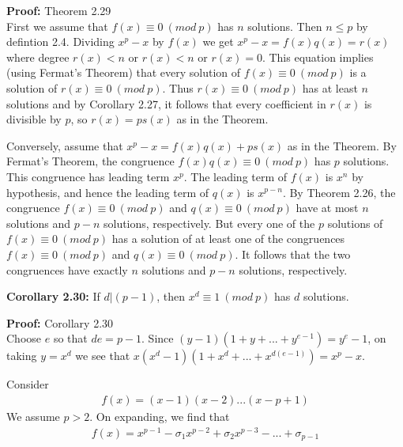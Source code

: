 \documentclass[a4paper]{article}
\begin{document}
\textbf{Proof:} Theorem 2.29\\
First we assume that $f(x)\equiv 0\ (mod\ p)$ has $n$ solutions. Then $n\leq p$ by defintion 2.4. Dividing $x^p-x$ by $f(x)$ we get $x^p-x=f(x)q(x)=r(x)$ where degree $r(x)<n$ or $r(x)<n$ or $r(x)=0$. This equation implies (using Fermat's Theorem) that every solution of $f(x)\equiv 0\ (mod\ p)$ is a solution of $r(x)\equiv 0\ (mod\ p)$. Thus $r(x)\equiv 0\ (mod\ p)$ has at least $n$ solutions and by Corollary 2.27, it follows that every coefficient in $r(x)$ is divisible by $p$, so $r(x)=ps(x)$ as in the Theorem.

Conversely, assume that $x^p-x=f(x)q(x)+ps(x)$ as in the Theorem. By Fermat's Theorem, the congruence $f(x)q(x)\equiv 0\ (mod\ p)$ has $p$ solutions. This congruence has leading term $x^p$. The leading term of $f(x)$ is $x^n$ by hypothesis, and hence the leading term of $q(x)$ is $x^{p-n}$. By Theorem 2.26, the congruence $f(x)\equiv 0\ (mod\ p)$ and $q(x)\equiv 0\ (mod\ p)$ have at most $n$ solutions and $p-n$ solutions, respectively. But every one of the $p$ solutions of $f(x)\equiv 0\ (mod\ p)$ has a solution of at least one of the congruences $f(x)\equiv 0\ (mod\ p)$ and $q(x)\equiv 0\ (mod\ p)$. It follows that the two congruences have exactly $n$ solutions and $p-n$ solutions, respectively.

\textbf{Corollary 2.30:}
If $d|(p-1)$, then $x^d\equiv 1\ (mod\ p)$ has $d$ solutions.

\textbf{Proof:} Corollary 2.30\\
Choose $e$ so that $de=p-1$. Since $(y-1)(1+y+...+y^{e-1})=y^e-1$, on taking $y=x^d$ we see that $x(x^d-1)(1+x^d+...+x^{d(e-1)})=x^p-x$.

Consider
\begin{align*}
    f(x)=(x-1)(x-2)...(x-p+1)
\end{align*}
We assume $p>2$. On expanding, we find that
\begin{align}
    f(x)=x^{p-1}-\sigma_{1}x^{p-2}+\sigma_{2}x^{p-3}-...+\sigma_{p-1}
\end{align}
\end{document}
